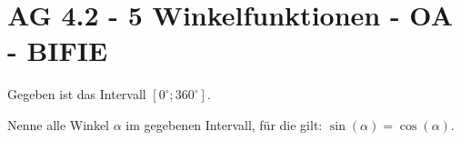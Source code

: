 \section{AG 4.2 - 5 Winkelfunktionen - OA - BIFIE}

\begin{beispiel}[AG 4.2]{1} %
Gegeben ist das Intervall $\left[0^\circ; 360^\circ\right]$.

Nenne alle Winkel $\alpha$ im gegebenen Intervall, für die gilt: $\sin(\alpha)=\cos(\alpha)$.
\leer

\end{beispiel}
